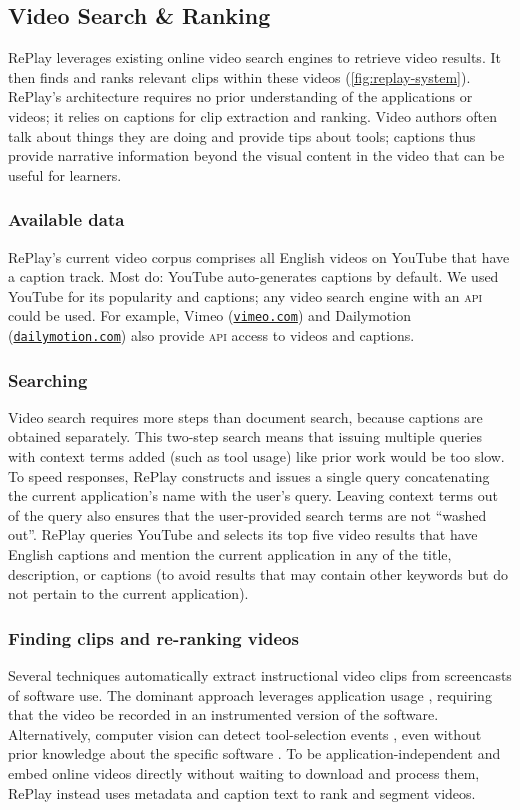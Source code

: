 \subsection{Video Search \& Ranking}
RePlay leverages existing online video search engines to retrieve video results. It then finds and ranks relevant clips within these videos (\autoref{fig:replay-system}). RePlay's architecture requires no prior understanding of the applications or videos; it relies on captions for clip extraction and ranking. Video authors often talk about things they are doing and provide tips about tools; captions thus provide narrative information beyond the visual content in the video that can be useful for learners.

\subsubsection{Available data}
RePlay's current video corpus comprises all English videos on YouTube that have a caption track. Most do: YouTube auto-generates captions by default. We used YouTube for its popularity and captions; any video search engine with an \textsc{api} could be used. For example, Vimeo (\href{https://vimeo.com}{\nolinkurl{vimeo.com}}) and Dailymotion (\href{https://dailymotion.com}{\nolinkurl{dailymotion.com}}) also provide \textsc{api} access to videos and captions.

\subsubsection{Searching}
Video search requires more steps than document search, because captions are obtained separately. This two-step search means that issuing multiple queries with context terms added (such as tool usage) like prior work \cite{Ekstrand2011} would be too slow. To speed responses, RePlay constructs and issues a single query concatenating the current application's name with the user's query. Leaving context terms out of the query also ensures that the user-provided search terms are not ``washed out''. RePlay queries YouTube and selects its top five video results that have English captions and mention the current application in any of the title, description, or captions (to avoid results that may contain other keywords but do not pertain to the current application).

\subsubsection{Finding clips and re-ranking videos}
Several techniques automatically extract instructional video clips from screencasts of software use. The dominant approach leverages application usage \cite{Grossman2010, Lafreniere2014, Chi2012, Wang2018}, requiring that the video be recorded in an instrumented version of the software. Alternatively, computer vision can detect tool-selection events \cite{Pongnumkul2011, Matejka2011}, even without prior knowledge about the specific software \cite{Banovic2012}. To be application-independent and embed online videos directly without waiting to download and process them, RePlay instead uses metadata and caption text to rank and segment videos. 

